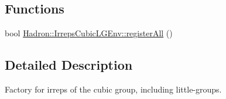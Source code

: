 \subsection*{Functions}
\begin{DoxyCompactItemize}
\item 
bool \mbox{\hyperlink{namespaceHadron_1_1IrrepsCubicLGEnv_a4c9a3cd2351dacf5ec8f2f58df4b7e3a}{Hadron\+::\+Irreps\+Cubic\+L\+G\+Env\+::register\+All}} ()
\end{DoxyCompactItemize}


\subsection{Detailed Description}
Factory for irreps of the cubic group, including little-\/groups. 

